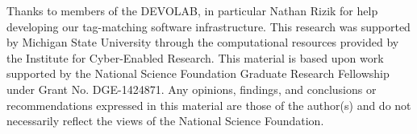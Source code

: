 \begin{acknowledgements}

Thanks to members of the DEVOLAB, in particular Nathan Rizik for help developing our tag-matching software infrastructure.
This research was supported by Michigan State University through the computational resources provided by the Institute for Cyber-Enabled Research.
This material is based upon work supported by the National Science Foundation Graduate Research Fellowship under Grant No. DGE-1424871.
Any opinions, findings, and conclusions or recommendations expressed in this material are those of the author(s) and do not necessarily reflect the views of the National Science Foundation.

\end{acknowledgements}